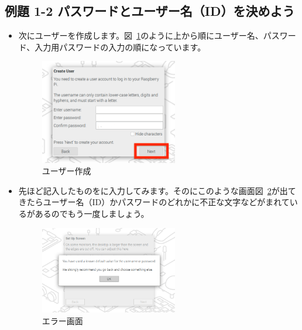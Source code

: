 \subsection*{例題 1-2 パスワードとユーザー名（ID）を決めよう}
\begin{itemize}
  \item 次にユーザーを作成します。図~\ref{fig:12}のように上から順にユーザー名、パスワード、入力用パスワードの入力の順になっています。
  
  \begin{figure}[h]
    \centering
    \begin{minipage}{5.228cm}
      \includegraphics[width=6.000cm]{text01-img/sw_image03.png}
      \caption{ユーザー作成}\label{fig:12}
    \end{minipage}
  \end{figure}

  \item  先ほど記入したものをに入力してみます。そのにこのような画面図~\ref{fig:13}が出てきたらユーザー名（ID）かパスワードのどれかに不正な文字などがまれているがあるのでもう一度しましょう。
  
  \begin{figure}[h]
    \centering
    \begin{minipage}{5.228cm}
      \includegraphics[width=6.000cm]{text01-img/sw_image04.png}
      \caption{エラー画面}\label{fig:13}
    \end{minipage}
  \end{figure}

  

\end{itemize}
